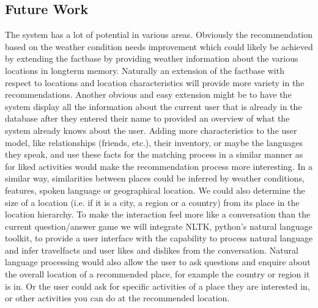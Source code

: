 \documentclass[11pt]{article} %
\begin{document}
\subsection{Future Work}
The system has a lot of potential in various areas. 
Obviously the recommendation based on the weather condition needs improvement which could likely be achieved by extending the factbase by providing weather information about the various locations in longterm memory.
Naturally an extension of the factbase with respect to locations and location characteristics will provide more variety in the recommendations.
Another obvious and easy extension might be to have the system display all the information about the current user that is already in the database after they entered their name to provided an overview of what the system already knows about the user. 
Adding more characteristics to the user model, like relationships (friends, etc.), their inventory, or maybe the languages they speak, and use these facts for the matching process in a similar manner as for liked activities would make the recommendation process more interesting.
In a similar way, similarities between places could be inferred by weather conditions, features, spoken language or geographical location.
We could also determine the size of a location (i.e. if it is a city, a region or a country) from its place in the location hierarchy.
To make the interaction feel more like a conversation than the current question/answer game we will integrate NLTK, python's natural language toolkit, to provide a user interface with the capability to process natural language and infer travelfacts and user likes and dislikes from the conversation.
Natural language processing would also allow the user to ask questions and enquire about the overall location of a recommended place, for example the country or region it is in. Or the user could ask for specific activities of a place they are interested in, or other activities you can do at the recommended location. 

 
\end{document}
